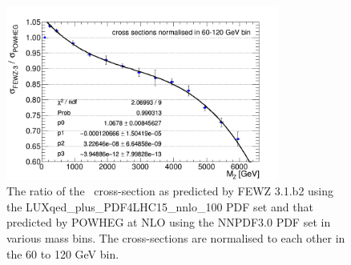 \begin{figure}[bh]
\begin{center}
\includegraphics[angle=0,width=0.8\textwidth]{figures/Zprime/2016/zPeakDY/powhegFEWZKFactor.png}
\end{center}
\caption{
The ratio of the \zee\ cross-section as predicted by FEWZ 3.1.b2 using the LUXqed\_plus\_PDF4LHC15\_nnlo\_100 PDF set and that predicted by
POWHEG at NLO using the NNPDF3.0 PDF set in various mass bins. The cross-sections are normalised to each other in the 60 to 120 GeV bin.
}
\label{fig:fewzPowheg}
\end{figure}



